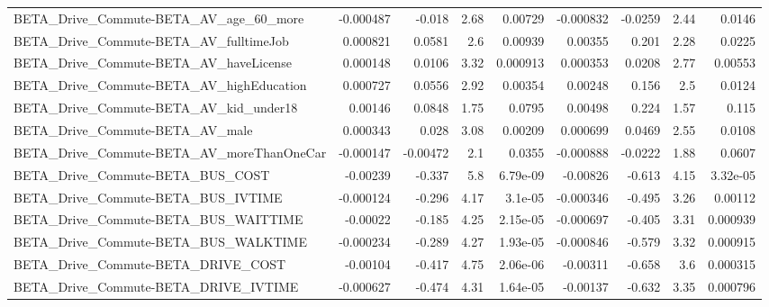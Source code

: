 \begin{tabular}{lrrrrrrrr}
BETA\_Drive\_Commute-BETA\_AV\_age\_60\_more             &   -0.000487 &       -0.018 &     2.68 &  0.00729 &  -0.000832 &     -0.0259 &         2.44 &        0.0146 \\
BETA\_Drive\_Commute-BETA\_AV\_fulltimeJob             &    0.000821 &       0.0581 &      2.6 &  0.00939 &    0.00355 &       0.201 &         2.28 &        0.0225 \\
BETA\_Drive\_Commute-BETA\_AV\_haveLicense             &    0.000148 &       0.0106 &     3.32 & 0.000913 &   0.000353 &      0.0208 &         2.77 &       0.00553 \\
BETA\_Drive\_Commute-BETA\_AV\_highEducation           &    0.000727 &       0.0556 &     2.92 &  0.00354 &    0.00248 &       0.156 &          2.5 &        0.0124 \\
BETA\_Drive\_Commute-BETA\_AV\_kid\_under18             &     0.00146 &       0.0848 &     1.75 &   0.0795 &    0.00498 &       0.224 &         1.57 &         0.115 \\
BETA\_Drive\_Commute-BETA\_AV\_male                    &    0.000343 &        0.028 &     3.08 &  0.00209 &   0.000699 &      0.0469 &         2.55 &        0.0108 \\
BETA\_Drive\_Commute-BETA\_AV\_moreThanOneCar          &   -0.000147 &     -0.00472 &      2.1 &   0.0355 &  -0.000888 &     -0.0222 &         1.88 &        0.0607 \\
BETA\_Drive\_Commute-BETA\_BUS\_COST                   &    -0.00239 &       -0.337 &      5.8 & 6.79e-09 &   -0.00826 &      -0.613 &         4.15 &      3.32e-05 \\
BETA\_Drive\_Commute-BETA\_BUS\_IVTIME                 &   -0.000124 &       -0.296 &     4.17 &  3.1e-05 &  -0.000346 &      -0.495 &         3.26 &       0.00112 \\
BETA\_Drive\_Commute-BETA\_BUS\_WAITTIME               &    -0.00022 &       -0.185 &     4.25 & 2.15e-05 &  -0.000697 &      -0.405 &         3.31 &      0.000939 \\
BETA\_Drive\_Commute-BETA\_BUS\_WALKTIME               &   -0.000234 &       -0.289 &     4.27 & 1.93e-05 &  -0.000846 &      -0.579 &         3.32 &      0.000915 \\
BETA\_Drive\_Commute-BETA\_DRIVE\_COST                 &    -0.00104 &       -0.417 &     4.75 & 2.06e-06 &   -0.00311 &      -0.658 &          3.6 &      0.000315 \\
BETA\_Drive\_Commute-BETA\_DRIVE\_IVTIME               &   -0.000627 &       -0.474 &     4.31 & 1.64e-05 &   -0.00137 &      -0.632 &         3.35 &      0.000796 \\

\end{tabular}
